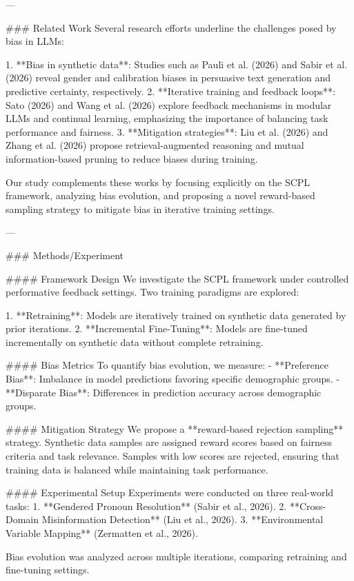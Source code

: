 ---

### Related Work  
Several research efforts underline the challenges posed by bias in LLMs:  

1. **Bias in synthetic data**: Studies such as Pauli et al. (2026) and Sabir et al. (2026) reveal gender and calibration biases in persuasive text generation and predictive certainty, respectively.  
2. **Iterative training and feedback loops**: Sato (2026) and Wang et al. (2026) explore feedback mechanisms in modular LLMs and continual learning, emphasizing the importance of balancing task performance and fairness.  
3. **Mitigation strategies**: Liu et al. (2026) and Zhang et al. (2026) propose retrieval-augmented reasoning and mutual information-based pruning to reduce biases during training.  

Our study complements these works by focusing explicitly on the SCPL framework, analyzing bias evolution, and proposing a novel reward-based sampling strategy to mitigate bias in iterative training settings.

---

### Methods/Experiment  

#### Framework Design  
We investigate the SCPL framework under controlled performative feedback settings. Two training paradigms are explored:  

1. **Retraining**: Models are iteratively trained on synthetic data generated by prior iterations.  
2. **Incremental Fine-Tuning**: Models are fine-tuned incrementally on synthetic data without complete retraining.  

#### Bias Metrics  
To quantify bias evolution, we measure:  
- **Preference Bias**: Imbalance in model predictions favoring specific demographic groups.  
- **Disparate Bias**: Differences in prediction accuracy across demographic groups.  

#### Mitigation Strategy  
We propose a **reward-based rejection sampling** strategy. Synthetic data samples are assigned reward scores based on fairness criteria and task relevance. Samples with low scores are rejected, ensuring that training data is balanced while maintaining task performance.

#### Experimental Setup  
Experiments were conducted on three real-world tasks:  
1. **Gendered Pronoun Resolution** (Sabir et al., 2026).  
2. **Cross-Domain Misinformation Detection** (Liu et al., 2026).  
3. **Environmental Variable Mapping** (Zermatten et al., 2026).  

Bias evolution was analyzed across multiple iterations, comparing retraining and fine-tuning settings.

